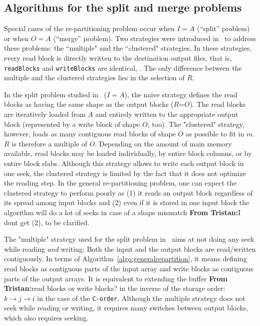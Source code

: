\documentclass[sigconf, nonacm]{acmart}
\newcommand{\tristan}[1]{\color{orange}\textbf{From Tristan:}#1\color{black}}
\begin{document}
{\subsection{Algorithms for the split and merge problems}

Special cases of the re-partitioning problem occur when $I=A$ (``split'' problem)
or when $O=A$ (``merge'' problem). Two strategies were introduced
in~\cite{seqalgorithms} to address these problems: the ``multiple" and the
``clustered" strategies. In these strategies, every read block is directly written to the
destination output files, that is, \texttt{readBlocks} and \texttt{writeBlocks} are identical, .
The only difference between the multiple and the clustered strategies lies in
the selection of $R$.

In the split problem studied in~\cite{seqalgorithms} ($I=A$), the naive
strategy defines the read blocks as having the same shape as the output blocks
($R$=$O$). The read blocks are iteratively loaded from $A$ and entirely written
to the appropriate output block (represented by a write block of shape $O$, too).
The "clustered" strategy, however, loads as
many contiguous read blocks of shape $O$ as possible to fit in $m$.
$R$ is therefore a multiple of $O$.
Depending on the amount of main memory available, read blocks may be loaded
individually, by entire block columns, or by entire block slabs.
Although this strategy allows to write each output block in one seek, the clustered strategy is limited by the fact
that it does not optimize the reading step.
In the general re-partitioning problem, one can expect the clustered strategy to
perform poorly as
(1) it reads an output block regardless of its spread among input blocks
and (2) even if it is stored in one input block the algorithm will do a lot of seeks in
case of a shape mismatch \tristan{I dont get (2), to be clarified}.

The "multiple" strategy used for the split problem in~\cite{seqalgorithms}
aims at not doing any seek while reading \textit{and} writing;
Both the input and the output blocks are read/written contiguously. In
terms of Algorithm~\ref{algo:generalrepartition}, it means defining read blocks as
contiguous parts of the input array and write blocks as contiguous parts of
the output arrays. It is equivalent to extending the buffer \tristan{read blocks or write blocks?} in the inverse of
the storage order: $k \rightarrow j \rightarrow i$ in the case
of the \texttt{C-order}. Although the multiple strategy does not seek while reading or writing, it 
requires many switches between output blocks, which also requires seeking. 

}
\end{document}
